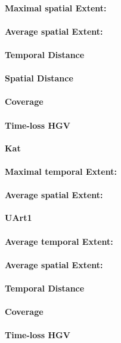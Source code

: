 \begin{table}[ht]
\paragraph{Maximal spatial Extent:}
\paragraph{Average spatial Extent:}
\paragraph{Temporal Distance}
\paragraph{Spatial Distance}
\paragraph{Coverage}
\paragraph{Time-loss HGV}

\large
\centerline{\textbf{Kat}}
\normalsize

\paragraph{Maximal temporal Extent:}
\paragraph{Average spatial Extent:}

\large
\centerline{\textbf{UArt1}}
\normalsize

\paragraph{Average temporal Extent:}
\paragraph{Average spatial Extent:}
\paragraph{Temporal Distance}
\paragraph{Coverage}
\paragraph{Time-loss HGV}


\end{table}
